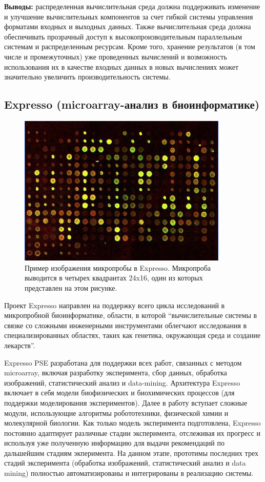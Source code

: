\textbf{Выводы:} распределенная вычислительная среда должна поддерживать изменение и улучшение вычислительных компонентов за счет гибкой системы управления форматами входных и выходных данных. Также вычислительная среда должна обеспечивать прозрачный доступ к высокопроизводительным параллельным системам и распределенным ресурсам. Кроме того, хранение результатов (в том числе и промежуточных) уже проведенных вычислений и возможность использования их в качестве входных данных в новых вычислениях может значительно увеличить производительность системы.

\subsection{Expresso (microarray-анализ в биоинформатике)}     
\begin{figure}
  \centering
    \includegraphics[width=10cm]{images/expresso-screenshot.png}
  \caption{Пример изображения микропробы в Expresso. Микропроба выводится в четырех квадрантах 24x16, один из которых представлен на этом рисунке.}
  \label{fig:expresso-screenshot}
\end{figure}

Проект Expresso направлен на поддержку всего цикла исследований в микропробной биоинформатике, области, в которой ``вычислительные системы в связке со сложными инженерными инструментами облегчают исследования в специализированных областях, таких как генетика, окружающая среда и создание лекарств''.
                                                                                                        
Expresso PSE разработана для поддержки всех работ, связанных с методом microarray, включая разработку эксперимента, сбор данных, обработка изображений, статистический анализ и data-mining. Архитектура Expresso включает в себя модели биофизических и биохимических процессов (для поддержки моделирования экспериментов). Далее в работу вступает сложные модули, использующие алгоритмы робототехники, физической химии и молекулярной биологии. Как только модель эксперимента подготовлена, Expresso постоянно адаптирует различные стадии эксперимента, отслеживая их прогресс и используя уже полученную информацию для выдачи рекомендаций по дальшейшим стадиям экперимента. На данном этапе, прототимы последних трех стадий эксперимента (обработка изображений, статистический анализ и data mining) полностью автоматизированы и интегрированы в реализацию системы.

